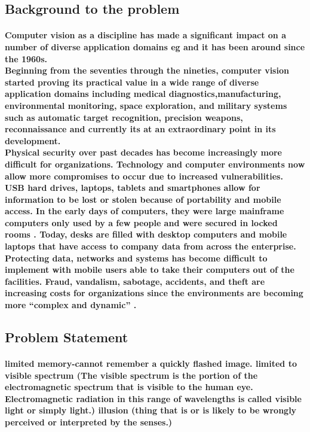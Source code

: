 \documentclass[11pt]{article}
\begin{document}
	 \subsection{\textbf{Background to the problem}}
	  \paragraph{\textmd{Computer vision as a discipline has made
	 a significant impact on a number of diverse application domains eg \cite{DUMMY:1} and it has been around since the 1960s.\\ Beginning from the seventies through the nineties, computer vision started proving its practical value in a wide range of diverse application domains including medical diagnostics,manufacturing, environmental monitoring, space exploration, and military systems such as automatic target recognition, precision weapons, reconnaissance\cite{DUMMY:3} and currently its at an extraordinary point in its development.\\Physical security over past decades has become increasingly more difficult for organizations. Technology and computer environments now allow more compromises to occur
	 due to increased vulnerabilities. USB hard drives, laptops, tablets and smartphones allow for information to be lost or stolen because of portability and mobile access. In the early days of
	 computers, they were large mainframe computers only used by a few people and were secured in locked rooms \cite{DUMMY:2}. Today, desks are filled with desktop computers and mobile laptops that have access to company data from across the enterprise. Protecting data, networks and systems has become difficult to implement with mobile users able to take their computers out of the facilities. Fraud, vandalism, sabotage, accidents, and theft are increasing costs for organizations since the environments are becoming more “complex and dynamic” \cite{DUMMY:2}.}}
	  
	 \subsection{\textbf{Problem Statement}}
	 
	 \paragraph{\textmd{limited memory-cannot remember a quickly flashed image. 
	 limited to visible spectrum (The visible spectrum is the portion of the electromagnetic spectrum that is visible to the human eye. Electromagnetic radiation in this range of wavelengths is called visible light or simply light.)	
	 illusion (thing that is or is likely to be wrongly perceived or interpreted by the senses.)}}
	 
\end{document}
